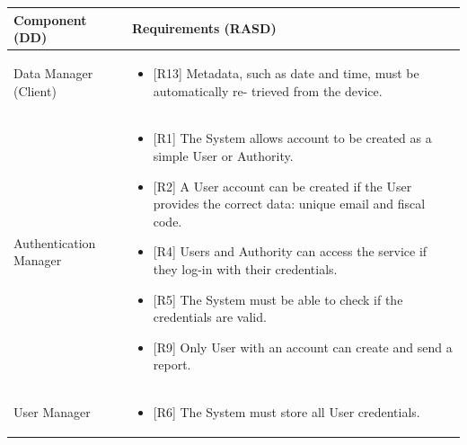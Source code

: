\documentclass{article}
\begin{document}
	\begin{longtable}{| p{5 cm} | p{8 cm} |} \hline
		Component (DD) & Requirements (RASD)  \\ \hline
		\newline Data Manager (Client) & 
		\begin{itemize}
			\item {[R13] Metadata, such as date and time, must be automatically re- trieved from the device.}
		\end{itemize}	\\ \hline
		\newline Authentication Manager & 
		\begin{itemize}
			\item  {[R1] The System allows account to be created as a simple User or Authority.}
			\item  {[R2] A User account can be created if the User provides the correct data: unique email and fiscal code.}
			\item  {[R4] Users and Authority can access the service if they log-in with their credentials.}
			\item  {[R5] The System must be able to check if the credentials are valid.
}
			\item  {[R9] Only User with an account can create and send a report.}
		\end{itemize}		\\	 \hline	
		\newline User Manager  & 
		\begin{itemize}
			\item  {[R6] The System must store all User credentials.}


\end{itemize}
\end{longtable}
\end{document}
